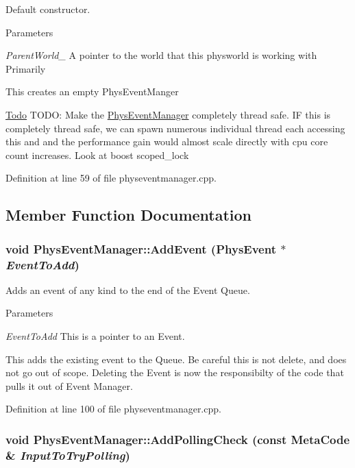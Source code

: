 Default constructor. 
\begin{DoxyParams}{Parameters}
\item[{\em ParentWorld\_\-}]A pointer to the world that this physworld is working with Primarily\end{DoxyParams}
This creates an empty PhysEventManger

\begin{Desc}
\item[\hyperlink{todo__todo000005}{Todo}]TODO: Make the \hyperlink{classPhysEventManager}{PhysEventManager} completely thread safe. IF this is completely thread safe, we can spawn numerous individual thread each accessing this and and the performance gain would almost scale directly with cpu core count increases. Look at boost scoped\_\-lock \end{Desc}


Definition at line 59 of file physeventmanager.cpp.

\subsection{Member Function Documentation}
\hypertarget{classPhysEventManager_a7c9bb46b17f6d9245817a402dc6a2f6f}{
\subsubsection[{AddEvent}]{\setlength{\rightskip}{0pt plus 5cm}void PhysEventManager::AddEvent ({\bf PhysEvent} $\ast$ {\em EventToAdd})}}
\label{d5/dd7/classPhysEventManager_a7c9bb46b17f6d9245817a402dc6a2f6f}


Adds an event of any kind to the end of the Event Queue. 
\begin{DoxyParams}{Parameters}
\item[{\em EventToAdd}]This is a pointer to an Event.\end{DoxyParams}
This adds the existing event to the Queue. Be careful this is not delete, and does not go out of scope. Deleting the Event is now the responsibilty of the code that pulls it out of Event Manager. 

Definition at line 100 of file physeventmanager.cpp.\hypertarget{classPhysEventManager_a1e99385441c5377a741561db581ef3ae}{
\subsubsection[{AddPollingCheck}]{\setlength{\rightskip}{0pt plus 5cm}void PhysEventManager::AddPollingCheck (const {\bf MetaCode} \& {\em InputToTryPolling})}}
\label{d5/dd7/classPhysEventManager_a1e99385441c5377a741561db581ef3ae}


